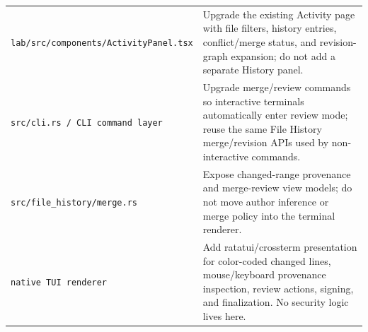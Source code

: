 \documentclass[11pt]{article}
\begin{document}
{\begin{tabularx}{\textwidth}{
  >{\raggedright\arraybackslash}p{}
  >{\raggedright\arraybackslash}X
}
\texttt{lab/src/components/ActivityPanel.tsx} & Upgrade the existing Activity page with file filters, history entries, conflict/merge status, and revision-graph expansion; do not add a separate History panel. \\
\texttt{src/cli.rs / CLI command layer} & Upgrade merge/review commands so interactive terminals automatically enter review mode; reuse the same File History merge/revision APIs used by non-interactive commands. \\
\texttt{src/file\_history/merge.rs} & Expose changed-range provenance and merge-review view models; do not move author inference or merge policy into the terminal renderer. \\
\texttt{native TUI renderer} & Add ratatui/crossterm presentation for color-coded changed lines, mouse/keyboard provenance inspection, review actions, signing, and finalization. No security logic lives here. \\
\bottomrule
\end{tabularx}
}
\end{document}
